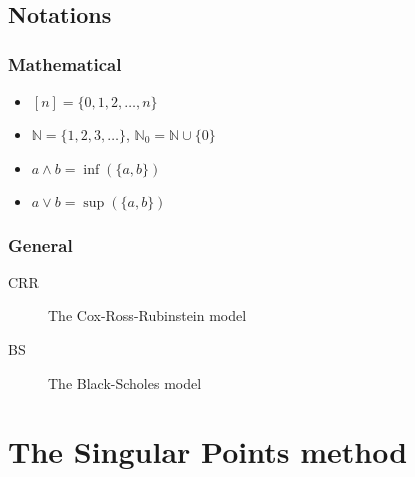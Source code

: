 \documentclass[10pt,a4paper]{amsbook}
\begin{document}
\frontmatter









\tableofcontents
\clearpage


\section*{Notations}

\subsection*{Mathematical}
\begin{itemize}
\item $ [n] = \{0, 1, 2, \dots, n\} $
\item $ \mathbb{N} = \{ 1, 2, 3, \dots \} $, $\mathbb{N}_0 = \mathbb{N} \cup \{ 0 \} $
\item $ a \wedge b = \inf(\{ a, b \}) $
\item $ a \vee b = \sup(\{ a, b \}) $
\end{itemize}

\subsection*{General}
\begin{description}
	\item[CRR] The Cox-Ross-Rubinstein model
	\item[BS] The Black-Scholes model
\end{description}



\mainmatter

%


%


\chapter{The Singular Points method}
\label{cha:sp}



\appendix


\backmatter

% 
\printbibliography
\end{document}

